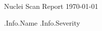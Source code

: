 \documentclass{article}
\begin{document}

\begin{titlepage}
\begin{center}
{\huge Nuclei Scan Report}
\vfill
\large{\today}

\end{center}
\end{titlepage}


{{.Info.Name}}
{{.Info.Severity}}

\end{document}
